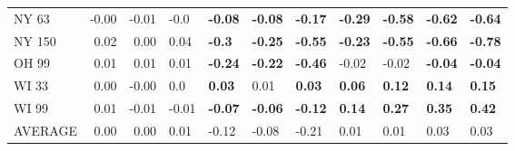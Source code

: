 \begin{tabular}{lrrllllllll}
NY 63   &    -0.00 &    -0.01 &           -0.0 &  \textbf{-0.08} &  \textbf{-0.08} &  \textbf{-0.17} &  \textbf{-0.29} &  \textbf{-0.58} &  \textbf{-0.62} &  \textbf{-0.64} \\
NY 150  &     0.02 &     0.00 &           0.04 &   \textbf{-0.3} &  \textbf{-0.25} &  \textbf{-0.55} &  \textbf{-0.23} &  \textbf{-0.55} &  \textbf{-0.66} &  \textbf{-0.78} \\
OH 99   &     0.01 &     0.01 &           0.01 &  \textbf{-0.24} &  \textbf{-0.22} &  \textbf{-0.46} &           -0.02 &           -0.02 &  \textbf{-0.04} &  \textbf{-0.04} \\
WI 33   &     0.00 &    -0.00 &            0.0 &   \textbf{0.03} &            0.01 &   \textbf{0.03} &   \textbf{0.06} &   \textbf{0.12} &   \textbf{0.14} &   \textbf{0.15} \\
WI 99   &     0.01 &    -0.01 &          -0.01 &  \textbf{-0.07} &  \textbf{-0.06} &  \textbf{-0.12} &   \textbf{0.14} &   \textbf{0.27} &   \textbf{0.35} &   \textbf{0.42} \\
AVERAGE &     0.00 &     0.00 &           0.01 &           -0.12 &           -0.08 &           -0.21 &            0.01 &            0.01 &            0.03 &            0.03 \\
\bottomrule
\end{tabular}
